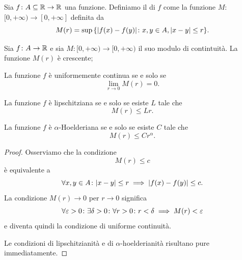 \begin{definition}
Sia $f\colon A\subseteq \mathbb R \to\mathbb R$ una funzione.
Definiamo il  di $f$ come la funzione
$M\colon$ $[0,+\infty) \to [0,+\infty]$ definita da
\[
  M(r) = \sup {\left\{ {\left|f(x)-f(y)\right|}\colon x,y \in A, {\left|x-y\right|} \le r \right\}}.
\]
\end{definition}

\begin{theorem}
Sia $f\colon A\to \mathbb R$ e sia $M\colon [0,+\infty)\to [0,+\infty)$ il suo
modulo di contintuità.
La funzione $M(r)$ è crescente;

La funzione $f$ è uniformemente continua se e solo se
\[
  \lim_{r\to 0} M(r) = 0.
\]

La funzione $f$ è lipschitziana se e solo se esiste $L$ tale che
\[
  M(r) \le Lr.
\]

La funzione $f$ è $\alpha$-Hoelderiana se e solo se esiste $C$ tale che
\[
  M(r) \le C r^\alpha.
\]
\end{theorem}
%
\begin{proof}
Osserviamo che la condizione
\[
   M(r) \le c
\]
è equivalente a
\[
\forall x,y\in A \colon {\left|x-y\right|}\le r \implies  {\left|f(x)-f(y)\right|} \le c.
\]
La condizione $M(r)\to 0$ per $r \to 0$ significa
\[
 \forall \varepsilon>0\colon \exists \delta>0 \colon \forall r>0\colon r<\delta \implies M(r)<\varepsilon
\]
e diventa quindi la condizione di uniforme continuità.

Le condizioni di lipschitzianità e di $\alpha$-hoelderianità risultano pure immediatamente.
\end{proof}


